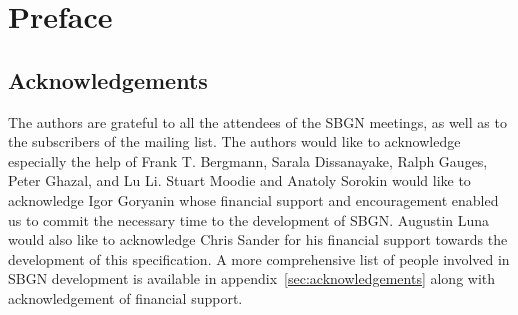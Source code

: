 \chapter{Preface}

\section*{Acknowledgements}

The authors are grateful to all the attendees of the SBGN meetings, as well as to the subscribers of the  mailing list.
The authors would like to acknowledge especially the help of Frank T. Bergmann, Sarala Dissanayake, Ralph Gauges, Peter Ghazal, and Lu Li.
Stuart Moodie and Anatoly Sorokin would like to acknowledge Igor Goryanin whose financial support and encouragement enabled us to commit the necessary time to the development of SBGN.
Augustin Luna would also like to acknowledge Chris Sander for his financial support towards the development of this specification.
A more comprehensive list of people involved in SBGN development is available in appendix~\ref{sec:acknowledgements} along with acknowledgement of financial support.
